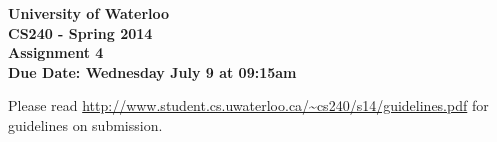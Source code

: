 \documentclass[12pt]{article}
\begin{document}
\begin{center}
{\Large\bf University of Waterloo}\\
\vspace{3mm}
{\Large\bf CS240 - Spring 2014}\\
\vspace{2mm}
{\Large\bf Assignment 4}\\
\vspace{3mm}
\textbf{Due Date: Wednesday July 9 at 09:15am}
\end{center}

\def\question#1{\item[\bf #1.]}
\def\part#1{\item[\bf #1)]}
\newcommand{\pc}[1]{\mbox{\textbf{#1}}}

Please read
\url{http://www.student.cs.uwaterloo.ca/~cs240/s14/guidelines.pdf}
for guidelines on submission.

\end{document}
